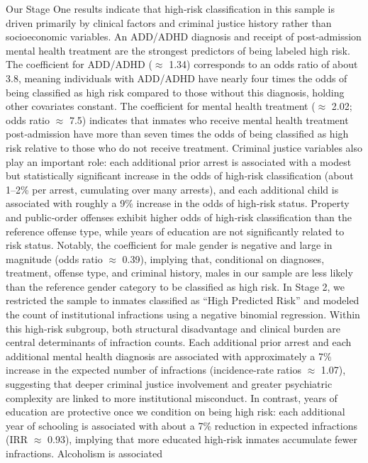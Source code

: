 \documentclass[
]{article}
\begin{document}
Our Stage One results indicate that high‑risk classification in this
sample is driven primarily by clinical factors and criminal justice
history rather than socioeconomic variables. An ADD/ADHD diagnosis and
receipt of post‑admission mental health treatment are the strongest
predictors of being labeled high risk. The coefficient for ADD/ADHD
(\(\approx\) 1.34) corresponds to an odds ratio of about 3.8, meaning
individuals with ADD/ADHD have nearly four times the odds of being
classified as high risk compared to those without this diagnosis,
holding other covariates constant. The coefficient for mental health
treatment (\(\approx\) 2.02; odds ratio \(\approx\) 7.5) indicates that
inmates who receive mental health treatment post‑admission have more
than seven times the odds of being classified as high risk relative to
those who do not receive treatment. Criminal justice variables also play
an important role: each additional prior arrest is associated with a
modest but statistically significant increase in the odds of high‑risk
classification (about 1--2\% per arrest, cumulating over many arrests),
and each additional child is associated with roughly a 9\% increase in
the odds of high‑risk status. Property and public‑order offenses exhibit
higher odds of high‑risk classification than the reference offense type,
while years of education are not significantly related to risk status.
Notably, the coefficient for male gender is negative and large in
magnitude (odds ratio \(\approx\) 0.39), implying that, conditional on
diagnoses, treatment, offense type, and criminal history, males in our
sample are less likely than the reference gender category to be
classified as high risk. In Stage 2, we restricted the sample to inmates
classified as ``High Predicted Risk'' and modeled the count of
institutional infractions using a negative binomial regression. Within
this high‑risk subgroup, both structural disadvantage and clinical
burden are central determinants of infraction counts. Each additional
prior arrest and each additional mental health diagnosis are associated
with approximately a 7\% increase in the expected number of infractions
(incidence‑rate ratios \(\approx\) 1.07), suggesting that deeper
criminal justice involvement and greater psychiatric complexity are
linked to more institutional misconduct. In contrast, years of education
are protective once we condition on being high risk: each additional
year of schooling is associated with about a 7\% reduction in expected
infractions (IRR \(\approx\) 0.93), implying that more educated
high‑risk inmates accumulate fewer infractions. Alcoholism is associated
\end{document}
